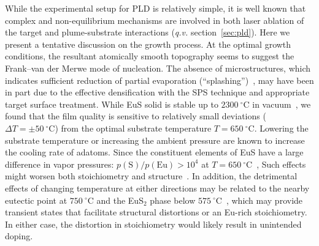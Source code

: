 While the experimental setup for PLD is relatively simple, it is well known that complex and non-equilibrium mechanisms are involved in both laser ablation of the target and plume-substrate interactions (\textit{q.v.} section~\ref{sec:pld}). Here we present a tentative discussion on the growth process. At the optimal growth conditions, the resultant atomically smooth topography seems to suggest the Frank--van der Merwe mode of nucleation. The absence of microstructures, which indicates sufficient reduction of partial evaporation (``splashing'')~\cite{PLD_book}, may have been in part due to the effective densification with the SPS technique and appropriate target surface treatment. While EuS solid is stable up to $2300~^{\circ}\mathrm{C}$ in vacuum~\cite{EuS_phase_diagram}, we found that the film quality is sensitive to relatively small deviations ($\Delta{}T=\pm50~^{\circ}\mathrm{C}$) from the optimal substrate temperature $T=650~^{\circ}\mathrm{C}$. Lowering the substrate temperature or increasing the ambient pressure are known to increase the cooling rate of adatoms. Since the constituent elements of EuS have a large difference in vapor pressures: $p(\mathrm{S})/p(\mathrm{Eu})>10^4$ at $T=650~^{\circ}\mathrm{C}$~\cite{elements}, Such effects might worsen both stoichiometry and structure~\cite{Metev1988}. In addition, the detrimental effects of changing temperature at either directions may be related to the nearby eutectic point at $750~^{\circ}\mathrm{C}$ and the EuS$_2$ phase below $575~^{\circ}\mathrm{C}$~\cite{EuS_phase_diagram}, which may provide transient states that facilitate structural distortions or an Eu-rich stoichiometry. In either case, the distortion in stoichiometry would likely result in unintended doping.

